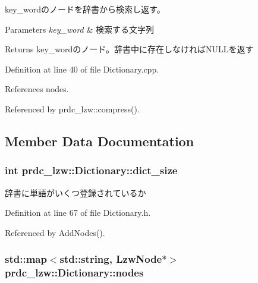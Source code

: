 key\-\_\-wordのノードを辞書から検索し返す。 


\begin{DoxyParams}{Parameters}
{\em key\-\_\-word} & 検索する文字列 \\
\hline
\end{DoxyParams}
\begin{DoxyReturn}{Returns}
key\-\_\-wordのノード。辞書中に存在しなければ\-N\-U\-L\-Lを返す 
\end{DoxyReturn}


Definition at line 40 of file Dictionary.\-cpp.



References nodes.



Referenced by prdc\-\_\-lzw\-::compress().



\subsection{Member Data Documentation}
\hypertarget{classprdc__lzw_1_1Dictionary_ac96b4db6d4692ba9b082fe32e54bcf0d}{
\subsubsection[{dict\-\_\-size}]{\setlength{\rightskip}{0pt plus 5cm}int prdc\-\_\-lzw\-::\-Dictionary\-::dict\-\_\-size\hspace{0.3cm}{\ttfamily [private]}}}\label{classprdc__lzw_1_1Dictionary_ac96b4db6d4692ba9b082fe32e54bcf0d}


辞書に単語がいくつ登録されているか 



Definition at line 67 of file Dictionary.\-h.



Referenced by Add\-Nodes().

\hypertarget{classprdc__lzw_1_1Dictionary_af204400d56e05c8a3fcc25bfd0990ff9}{
\subsubsection[{nodes}]{\setlength{\rightskip}{0pt plus 5cm}std\-::map$<$std\-::string, {\bf Lzw\-Node}$\ast$$>$ prdc\-\_\-lzw\-::\-Dictionary\-::nodes\hspace{0.3cm}{\ttfamily [private]}}}\label{classprdc__lzw_1_1Dictionary_af204400d56e05c8a3fcc25bfd0990ff9}


